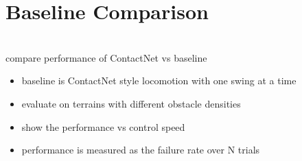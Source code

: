 \section{Baseline Comparison}

\begin{todo}\\
  compare performance of ContactNet vs baseline
  \begin{itemize}
    \item baseline is ContactNet style locomotion with one swing at a time
    \item evaluate on terrains with different obstacle densities
    \item show the performance vs control speed
    \item performance is measured as the failure rate over N trials
  \end{itemize}
\end{todo}
